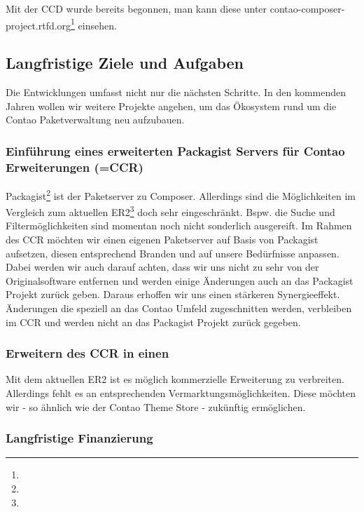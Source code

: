 \documentclass[
paper=a4,
draft=false,%
fontsize=10pt%
]{scrartcl}
\begin{document}
Mit der CCD wurde bereits begonnen, man kann diese unter contao-composer-project.rtfd.org\footnote{} einsehen.

\pagebreak
\subsection{Langfristige Ziele und Aufgaben}
\label{sec:long-term-goals}

Die Entwicklungen umfasst nicht nur die nächsten Schritte. In den kommenden Jahren wollen wir weitere Projekte angehen, um das Ökosystem rund um die Contao Paketverwaltung neu aufzubauen.

\subsubsection{Einführung eines erweiterten Packagist Servers für Contao Erweiterungen (=CCR)}

Packagist\footnote{} ist der Paketserver zu Composer. Allerdings sind die Möglichkeiten im Vergleich zum aktuellen ER2\footnote{} doch sehr eingeschränkt. Bspw. die Suche und Filtermöglichkeiten sind momentan noch nicht sonderlich ausgereift. Im Rahmen des CCR möchten wir einen eigenen Paketserver auf Basis von Packagist aufsetzen, diesen entsprechend Branden und auf unsere Bedürfnisse anpassen.\\
Dabei werden wir auch darauf achten, dass wir uns nicht zu sehr von der Originalsoftware entfernen und werden einige Änderungen auch an das Packagist Projekt zurück geben. Daraus erhoffen wir uns einen stärkeren Synergieeffekt. Änderungen die speziell an das Contao Umfeld zugeschnitten werden, verbleiben im CCR und werden nicht an das Packagist Projekt zurück gegeben.

\subsubsection{Erweitern des CCR in einen }

Mit dem aktuellen ER2 ist es möglich kommerzielle Erweiterung zu verbreiten. Allerdings fehlt es an entsprechenden Vermarktungsmöglichkeiten. Diese möchten wir - so ähnlich wie der Contao Theme Store - zukünftig ermöglichen.

\subsubsection{Langfristige Finanzierung}
\end{document}
